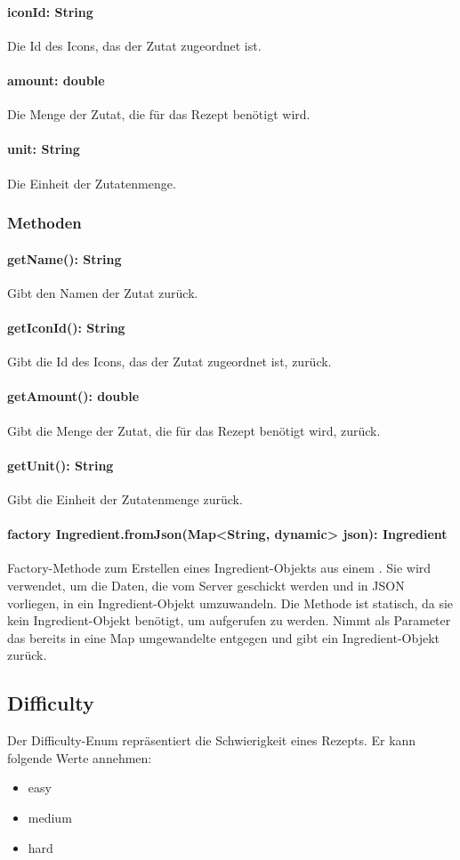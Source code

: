 \documentclass[parskip=full]{scrartcl}
\begin{document}
\paragraph{iconId: String}
Die Id des Icons, das der Zutat zugeordnet ist.
\paragraph{amount: double}
Die Menge der Zutat, die für das Rezept benötigt wird.
\paragraph{unit: String}
Die Einheit der Zutatenmenge.

\subsubsection{Methoden}
\paragraph{getName(): String}
Gibt den Namen der Zutat zurück.
\paragraph{getIconId(): String}
Gibt die Id des Icons, das der Zutat zugeordnet ist, zurück.
\paragraph{getAmount(): double}
Gibt die Menge der Zutat, die für das Rezept benötigt wird, zurück.
\paragraph{getUnit(): String}
Gibt die Einheit der Zutatenmenge zurück.
\paragraph{factory Ingredient.fromJson(Map<String, dynamic> json): Ingredient}
Factory-Methode zum Erstellen eines Ingredient-Objekts aus einem . Sie wird verwendet, um die Daten, die vom Server geschickt werden und in \Gls{JSON} vorliegen, in ein Ingredient-Objekt umzuwandeln. Die Methode ist statisch, da sie kein Ingredient-Objekt benötigt, um aufgerufen zu werden. Nimmt als Parameter das bereits in eine Map umgewandelte  entgegen und gibt ein Ingredient-Objekt zurück.
\subsection{Difficulty}
Der Difficulty-Enum repräsentiert die Schwierigkeit eines Rezepts. Er kann folgende Werte annehmen:
\begin{itemize}
\item easy
\item medium
\item hard
\end{itemize}
\end{document}
